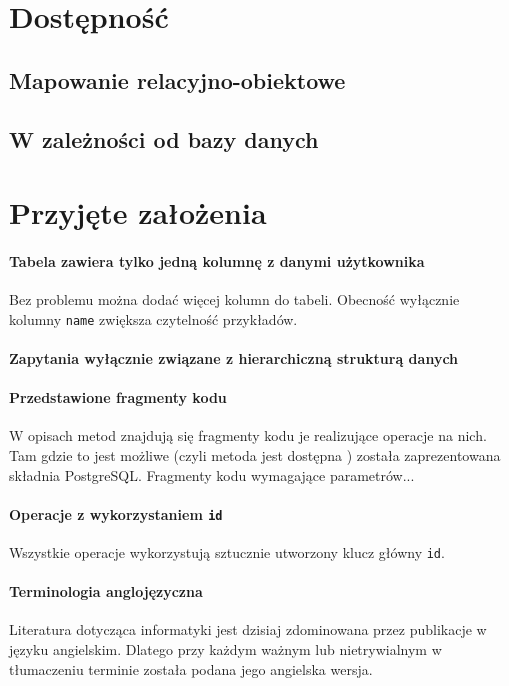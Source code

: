 \section{Dostępność}
\subsection{Mapowanie relacyjno-obiektowe}
\subsection{W zależności od bazy danych}


\section{Przyjęte założenia}

\paragraph{Tabela zawiera tylko jedną kolumnę z danymi użytkownika} 
Bez problemu można dodać więcej kolumn do tabeli. Obecność wyłącznie kolumny \texttt{name} zwiększa czytelność przykładów.
\paragraph{Zapytania wyłącznie związane z hierarchiczną strukturą danych} 

\paragraph{Przedstawione fragmenty kodu} 
W opisach metod znajdują się fragmenty kodu je realizujące operacje na nich. 
Tam gdzie to jest możliwe (czyli metoda jest dostępna ) została zaprezentowana składnia PostgreSQL.
Fragmenty kodu  wymagające parametrów...

\paragraph{Operacje z wykorzystaniem \texttt{id}} Wszystkie operacje wykorzystują sztucznie utworzony klucz główny \texttt{id}. 

\paragraph{Terminologia anglojęzyczna} 
Literatura dotycząca informatyki jest dzisiaj zdominowana przez publikacje w języku angielskim. Dlatego przy każdym ważnym lub nietrywialnym w tłumaczeniu terminie została podana jego angielska wersja. 


